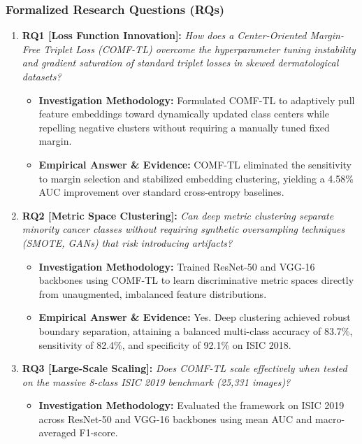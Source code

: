 \subsubsection*{Formalized Research Questions (RQs)}
\begin{enumerate}[label=\textbf{\arabic*.}, leftmargin=*]
  \item \textbf{RQ1 [Loss Function Innovation]:} \textit{How does a Center-Oriented Margin-Free Triplet Loss (COMF-TL) overcome the hyperparameter tuning instability and gradient saturation of standard triplet losses in skewed dermatological datasets?}
  \begin{itemize}[leftmargin=1.5em]
    \item \textbf{Investigation Methodology:} Formulated COMF-TL to adaptively pull feature embeddings toward dynamically updated class centers while repelling negative clusters without requiring a manually tuned fixed margin.
    \item \textbf{Empirical Answer \& Evidence:} COMF-TL eliminated the sensitivity to margin selection and stabilized embedding clustering, yielding a 4.58\% AUC improvement over standard cross-entropy baselines.
  \end{itemize}
  \item \textbf{RQ2 [Metric Space Clustering]:} \textit{Can deep metric clustering separate minority cancer classes without requiring synthetic oversampling techniques (SMOTE, GANs) that risk introducing artifacts?}
  \begin{itemize}[leftmargin=1.5em]
    \item \textbf{Investigation Methodology:} Trained ResNet-50 and VGG-16 backbones using COMF-TL to learn discriminative metric spaces directly from unaugmented, imbalanced feature distributions.
    \item \textbf{Empirical Answer \& Evidence:} Yes. Deep clustering achieved robust boundary separation, attaining a balanced multi-class accuracy of 83.7\%, sensitivity of 82.4\%, and specificity of 92.1\% on ISIC 2018.
  \end{itemize}
  \item \textbf{RQ3 [Large-Scale Scaling]:} \textit{Does COMF-TL scale effectively when tested on the massive 8-class ISIC 2019 benchmark (25,331 images)?}
  \begin{itemize}[leftmargin=1.5em]
    \item \textbf{Investigation Methodology:} Evaluated the framework on ISIC 2019 across ResNet-50 and VGG-16 backbones using mean AUC and macro-averaged F1-score.

\end{itemize}
\end{enumerate}
